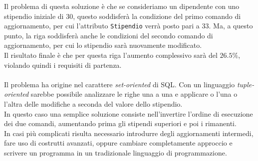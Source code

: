 Il problema di questa soluzione è che se consideriamo un dipendente con uno stipendio iniziale di 30, questo soddisferà la condizione del primo comando di aggiornamento, per cui l'attributo \texttt{Stipendio} verrà posto pari a 33. Ma, a questo punto, la riga soddisferà anche le condizioni del secondo comando di aggiornamento, per cui lo stipendio sarà nuovamente modificato. \\
Il risultato finale è che per questa riga l'aumento complessivo sarà del $26.5 \%$, violando quindi i requisiti di partenza.\\\\
Il problema ha origine nel carattere \textit{set-oriented} di SQL. Con un linguaggio \textit{tuple-oriented} sarebbe possibile analizzare le righe una a una e applicare o l'una o l'altra delle modifiche a seconda del valore dello stipendio.\\
In questo caso una semplice soluzione consiste nell'invertire l'ordine di esecuzione dei due comandi, aumentando prima gli stipendi superiori e poi i rimanenti.\\
In casi più complicati risulta necessario introdurre degli aggiornamenti intermedi, fare uso di costrutti avanzati, oppure cambiare completamente approccio e scrivere un programma in un tradizionale linguaggio di programmazione. 